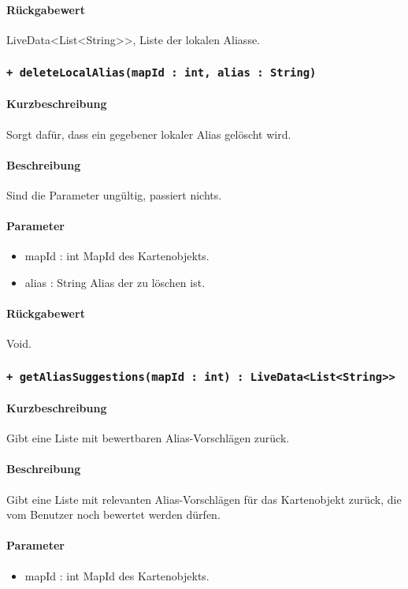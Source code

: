 \paragraph*{Rückgabewert}
LiveData<List<String>>, Liste der lokalen Aliasse.

\subsubsection{\texttt{+ deleteLocalAlias(mapId : int, alias : String)}}%
\paragraph*{Kurzbeschreibung}
Sorgt dafür, dass ein gegebener lokaler Alias gelöscht wird.
\paragraph*{Beschreibung}
Sind die Parameter ungültig, passiert nichts.
\paragraph*{Parameter}
\begin{itemize}
    \item mapId : int MapId des Kartenobjekts.
    \item alias : String Alias der zu löschen ist.
\end{itemize}
\paragraph*{Rückgabewert}
Void.

\subsubsection{\texttt{+ getAliasSuggestions(mapId : int) : LiveData<List<String>>}}%
\paragraph*{Kurzbeschreibung}
Gibt eine Liste mit bewertbaren Alias-Vorschlägen zurück.
\paragraph*{Beschreibung}
Gibt eine Liste mit relevanten Alias-Vorschlägen für das Kartenobjekt zurück, 
die vom Benutzer noch bewertet werden dürfen.
\paragraph*{Parameter}
\begin{itemize}
    \item mapId : int MapId des Kartenobjekts.
\end{itemize}
